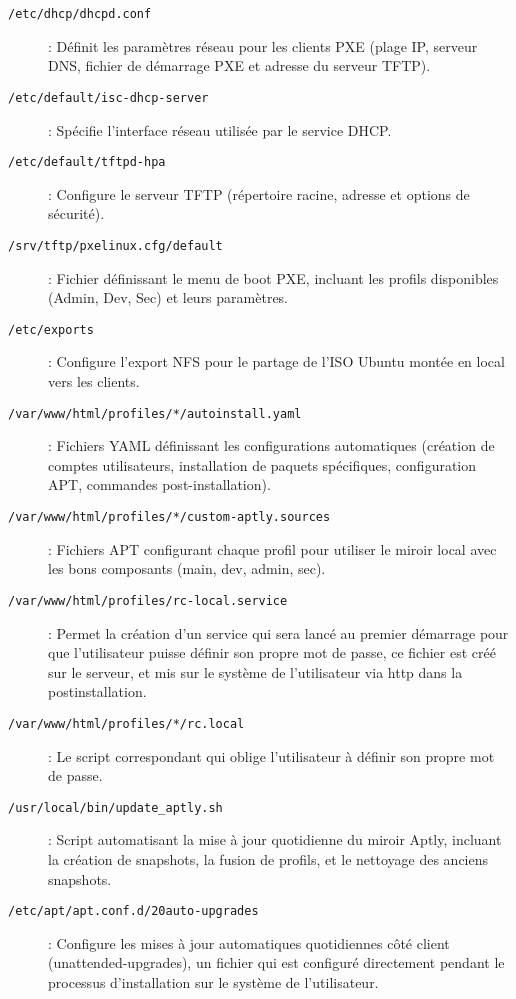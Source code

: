 \documentclass[a4paper,12pt]{article}
\begin{document}
\begin{description}

\item[\texttt{/etc/dhcp/dhcpd.conf}] :
Définit les paramètres réseau pour les clients PXE (plage IP, serveur DNS, fichier de démarrage PXE et adresse du serveur TFTP).

\item[\texttt{/etc/default/isc-dhcp-server}]:
Spécifie l'interface réseau utilisée par le service DHCP.

\item[\texttt{/etc/default/tftpd-hpa}]:
Configure le serveur TFTP (répertoire racine, adresse et options de sécurité).

\item[\texttt{/srv/tftp/pxelinux.cfg/default}]:
Fichier définissant le menu de boot PXE, incluant les profils disponibles (Admin, Dev, Sec) et leurs paramètres.

\item[\texttt{/etc/exports}]:
Configure l’export NFS pour le partage de l’ISO Ubuntu montée en local vers les clients.

\item[\texttt{/var/www/html/profiles/*/autoinstall.yaml}]:
Fichiers YAML définissant les configurations automatiques (création de comptes utilisateurs, installation de paquets spécifiques, configuration APT, commandes post-installation).

\item[\texttt{/var/www/html/profiles/*/custom-aptly.sources}]:
Fichiers APT configurant chaque profil pour utiliser le miroir local avec les bons composants (main, dev, admin, sec).

\item[\texttt{/var/www/html/profiles/rc-local.service}]:
Permet la création d'un service qui sera lancé au premier démarrage pour que l'utilisateur puisse définir son propre mot de passe, ce fichier est créé sur le serveur, et mis sur le système de l'utilisateur via http dans la postinstallation.

\item[\texttt{/var/www/html/profiles/*/rc.local}]:
Le script correspondant qui oblige l'utilisateur à définir son propre mot de passe.

\item[\texttt{/usr/local/bin/update\_aptly.sh}]:
Script automatisant la mise à jour quotidienne du miroir Aptly, incluant la création de snapshots, la fusion de profils, et le nettoyage des anciens snapshots.

\item[\texttt{/etc/apt/apt.conf.d/20auto-upgrades}]:
Configure les mises à jour automatiques quotidiennes côté client (unattended-upgrades), un fichier qui est configuré directement pendant le processus d'installation sur le système de l'utilisateur.

\end{description}
\end{document}
